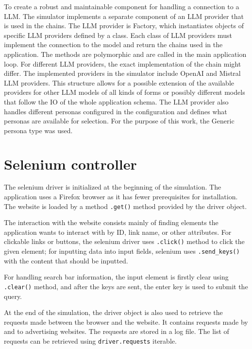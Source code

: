 To create a robust and maintainable component for handling a connection to a LLM. The simulator implements a separate component of an LLM provider that is used in the chains. The LLM provider is Factory, which instantiates objects of specific LLM providers defined by a class. Each class of LLM providers must implement the connection to the model and return the chains used in the application. The methods are polymorphic and are called in the main application loop. For different LLM providers, the exact implementation of the chain might differ. The implemented providers in the simulator include OpenAI and Mistral LLM providers. This structure allows for a possible extension of the available providers for other LLM models of all kinds of forms or possibly different models that follow the IO of the whole application schema. The LLM provider also handles different personas configured in the configuration and defines what personas are available for selection. For the purpose of this work, the Generic persona type was used.

\section{Selenium controller}

The selenium driver is initialized at the beginning of the simulation. The application uses a Firefox browser as it has fewer prerequisites for installation. The website is loaded by a method \verb|.get()| method provided by the driver object. 

The interaction with the website consists mainly of finding elements the application wants to interact with by ID, link name, or other attributes. For clickable links or buttons, the selenium driver uses \verb|.click()| method to click the given element; for inputting data into input fields, selenium uses \verb|.send_keys()| with the content that should be inputted.

For handling search bar information, the input element is firstly clear using \verb|.clear()| method, and after the keys are sent, the enter key is used to submit the query.

At the end of the simulation, the driver object is also used to retrieve the requests made between the browser and the website. It contains requests made by and to advertising websites. The requests are stored in a log file. The list of requests can be retrieved using \verb|driver.requests| iterable. 


